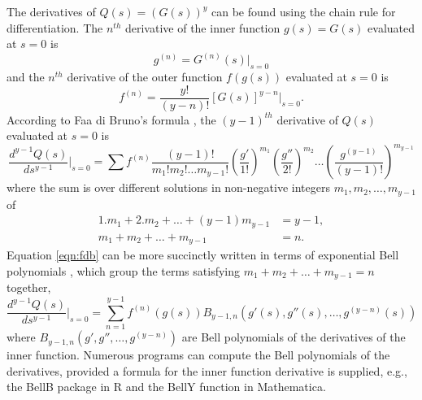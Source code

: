 \documentclass{imammb}
\numberwithin{equation}{section}
\begin{document}
The derivatives of $Q(s) = (G(s))^y$ can be found using the chain rule for differentiation. The $n^{th}$ derivative of the inner function $g(s) = G(s)$ evaluated at $s=0$ is
\begin{equation}\label{eqn:g}
    g^{(n)}=  G^{(n)}(s)  \Bigr|_{s=0}
\end{equation}
and the $n^{th}$ derivative of the outer function $f(g(s))$ evaluated at $s=0$ is
\begin{equation}\label{eqn:f}
    f^{(n)}= \frac{y!}{(y-n)!} [G(s)]^{y-n}  \Bigr|_{s=0}.
\end{equation}
According to Faa di Bruno's formula \citep{Johnson2002-nq}, the $(y-1)^{th}$ derivative of $Q(s)$ evaluated at $s=0$ is
\begin{equation}\label{eqn:fdb}
    \frac{d^{y-1} Q(s)}{ds^{y-1}} \Bigr|_{s=0} = \sum  f^{(n)} \frac{(y-1)!}{m_1! m_2! \dots m_{y-1}!} \left ( \frac{g'}{1!}\right )^{m_1} \left ( \frac{g''}{2!} \right )^{m_2}\dots \left ( \frac{g^{(y-1)}}{(y-1)!} \right )^{m_{y-1}}
\end{equation}
where the sum is over different solutions in non-negative integers $m_1, m_2, \dots, m_{y-1}$ of
\begin{align*}
    1. m_1 + 2. m_2 + \dots + (y-1) m_{y-1} &= y-1,\\
     m_1 + m_2 + \dots + m_{y-1} &= n.
\end{align*}
Equation \eqref{eqn:fdb} can be more succinctly written in terms of exponential Bell polynomials \citep{Johnson2002-nq, Cvijovic2011-ml}, which group the terms satisfying $m_1 + m_2 + \dots + m_{y-1} = n$ together,
\begin{equation}\label{eqn:fdbbell}
    \frac{d^{y-1} Q(s)}{ds^{y-1}} \Bigr|_{s=0} = \sum_{n=1}^{y-1}  f^{(n)}(g(s)) B_{y-1,n}(g'(s), g''(s), \dots, g^{(y-n)}(s))
\end{equation}
where $B_{y-1,n}(g', g'', \dots, g^{(y-n)})$ are Bell polynomials of the derivatives of the inner function. Numerous programs can compute the Bell polynomials of the derivatives, provided a formula for the inner function derivative is supplied, e.g., the BellB package in R \citep{??} and the BellY function in Mathematica.
\end{document}
